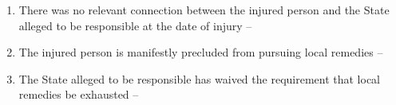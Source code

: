 \begin{enumerate}
\begin{enumerate}
\begin{enumerate}
            \item There was no relevant connection between the injured person and the State alleged to be responsible at the date of injury -- 
            \item The injured person is manifestly precluded from pursuing local remedies -- 
            \item The State alleged to be responsible has waived the requirement that local remedies be exhausted -- 
        \end{enumerate}
    \end{enumerate}
\end{enumerate}

